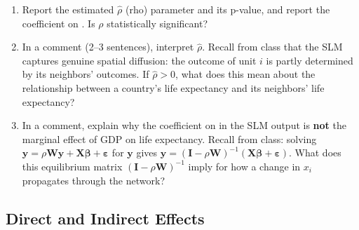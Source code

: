 \begin{enumerate}[label=\alph*)]

  \item Report the estimated $\hat{\rho}$ (rho) parameter and its p-value, and report the coefficient on . Is $\rho$ statistically significant?

  \item In a comment (2--3 sentences), interpret $\hat{\rho}$. Recall from class that the SLM captures genuine spatial diffusion: the outcome of unit $i$ is partly determined by its neighbors' outcomes. If $\hat{\rho} > 0$, what does this mean about the relationship between a country's life expectancy and its neighbors' life expectancy?

  \item In a comment, explain why the coefficient on  in the SLM output is \textbf{not} the marginal effect of GDP on life expectancy. Recall from class: solving $\mathbf{y} = \rho\mathbf{W}\mathbf{y} + \mathbf{X}\boldsymbol{\beta} + \boldsymbol{\varepsilon}$ for $\mathbf{y}$ gives $\mathbf{y} = (\mathbf{I} - \rho\mathbf{W})^{-1}(\mathbf{X}\boldsymbol{\beta} + \boldsymbol{\varepsilon})$. What does this equilibrium matrix $(\mathbf{I} - \rho\mathbf{W})^{-1}$ imply for how a change in $x_i$ propagates through the network?

\end{enumerate}

\subsection{Direct and Indirect Effects}

